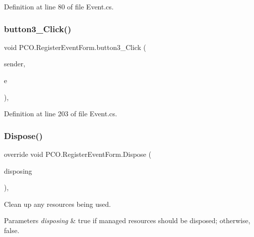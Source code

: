 Definition at line 80 of file Event.\+cs.

\mbox{\label{classPCO_1_1RegisterEventForm_a54bf47c9d0a7961847ce56ce534b8c7b}} 
\subsubsection{\texorpdfstring{button3\+\_\+\+Click()}{button3\_Click()}}
{\footnotesize\ttfamily void P\+C\+O.\+Register\+Event\+Form.\+button3\+\_\+\+Click (\begin{DoxyParamCaption}\item[{object}]{sender,  }\item[{Event\+Args}]{e }\end{DoxyParamCaption})\hspace{0.3cm}{\ttfamily [inline]}, {\ttfamily [private]}}



Definition at line 203 of file Event.\+cs.

\mbox{\label{classPCO_1_1RegisterEventForm_ab275145dffd94e2613acb7c4368242c3}} 
\subsubsection{\texorpdfstring{Dispose()}{Dispose()}}
{\footnotesize\ttfamily override void P\+C\+O.\+Register\+Event\+Form.\+Dispose (\begin{DoxyParamCaption}\item[{bool}]{disposing }\end{DoxyParamCaption})\hspace{0.3cm}{\ttfamily [inline]}, {\ttfamily [protected]}}



Clean up any resources being used. 


\begin{DoxyParams}{Parameters}
{\em disposing} & true if managed resources should be disposed; otherwise, false.\\
\hline
\end{DoxyParams}


